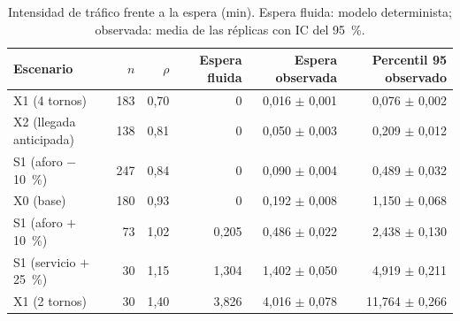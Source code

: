 \begin{table}[htbp]
\centering\small
\caption{Intensidad de tráfico frente a la espera (min). Espera fluida: modelo
determinista; observada: media de las réplicas con IC del 95~\%.}
\label{tab:rho}
\begin{tabular}{@{}lrrrrr@{}}
\toprule
Escenario & $n$ & $\rho$ & Espera fluida & Espera observada & Percentil 95 observado \\
\midrule
X1 (4 tornos) & 183 & 0,70 & 0 & 0,016 $\pm$ 0,001 & 0,076 $\pm$ 0,002 \\
X2 (llegada anticipada) & 138 & 0,81 & 0 & 0,050 $\pm$ 0,003 & 0,209 $\pm$ 0,012 \\
S1 (aforo $-$10~\%) & 247 & 0,84 & 0 & 0,090 $\pm$ 0,004 & 0,489 $\pm$ 0,032 \\
X0 (base) & 180 & 0,93 & 0 & 0,192 $\pm$ 0,008 & 1,150 $\pm$ 0,068 \\
S1 (aforo $+$10~\%) & 73 & 1,02 & 0,205 & 0,486 $\pm$ 0,022 & 2,438 $\pm$ 0,130 \\
S1 (servicio $+$25~\%) & 30 & 1,15 & 1,304 & 1,402 $\pm$ 0,050 & 4,919 $\pm$ 0,211 \\
X1 (2 tornos) & 30 & 1,40 & 3,826 & 4,016 $\pm$ 0,078 & 11,764 $\pm$ 0,266 \\
\bottomrule
\end{tabular}
\end{table}

